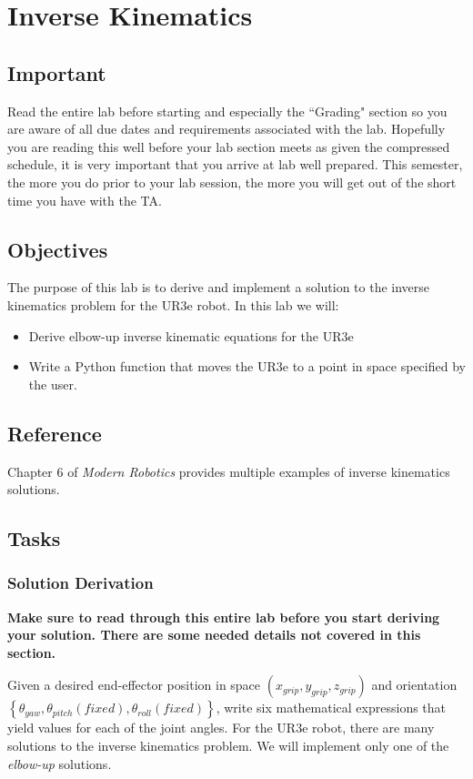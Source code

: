 \chapter{Inverse Kinematics}
\section{Important}
Read the entire lab before starting and especially the ``Grading" section so you are aware of all due dates and requirements associated with the lab.  Hopefully you are reading this well before your lab section meets as given the compressed schedule, it is very important that you arrive at lab well prepared.  This semester, the more you do prior to your lab session, the more you will get out of the short time you have with the TA.
\section{Objectives}
The purpose of this lab is to derive and implement a solution to the inverse kinematics problem for the UR3e robot.  In this lab we will:
\begin{itemize}
	\item Derive elbow-up inverse kinematic equations for the UR3e
	\item Write a Python function that moves the UR3e to a point in space specified by the user.
\end{itemize}

\section{Reference}
Chapter 6 of \textit{Modern Robotics} provides multiple examples of inverse kinematics solutions.

\section{Tasks}
\subsection{Solution Derivation}
\textbf{Make sure to read through this entire lab before you start deriving your solution.  There are some
needed details not covered in this section.}


Given a desired end-effector position in space $(x_{grip},y_{grip},z_{grip})$ and orientation $\left\{\theta_{yaw},\theta_{pitch}(fixed),
\theta_{roll}(fixed)\right\}$, write six mathematical expressions 
that yield values for each of the joint angles. For the UR3e robot, there are many solutions to the inverse kinematics
problem.  We will implement only one of the \textit{elbow-up} solutions.

